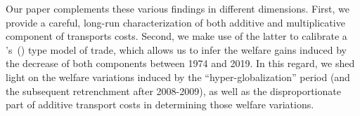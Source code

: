 \documentclass[a4paper,11pt]{article}
\newcommand\cites[1]{\citeauthor{#1}'s\ (\citeyear{#1})}
\begin{document}
Our paper complements these various findings in different dimensions. First, we provide a careful, long-run characterization of both additive and multiplicative component of transports costs. Second, we make use of the latter to calibrate a \cites{melitz} type model of trade, which allows us to infer the welfare gains induced by the decrease of both components between 1974 and 2019. In this regard, we shed light on the welfare variations induced by the ``hyper-globalization'' period (and the subsequent retrenchment after 2008-2009), as well as the disproportionate part of additive transport costs in determining those welfare variations. %


\smallskip
\end{document}
